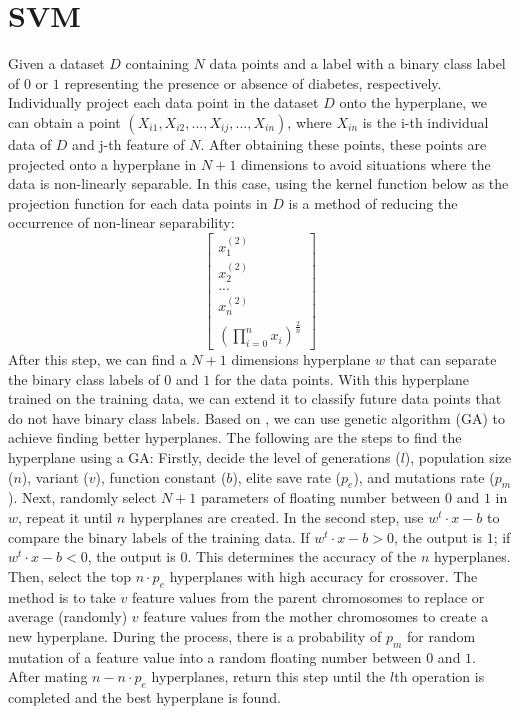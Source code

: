 \documentclass[twocolumn,10pt]{article}
\begin{document}
\section{SVM}
  Given a dataset $D$ containing $N$ data points and a label with a binary class label of $0$ or $1$ representing the presence 
  or absence of diabetes, respectively. Individually project each data point in the dataset $D$ onto the hyperplane, we can obtain 
  a point $(X_{i1}, X_{i2}, ..., X_{ij}, ..., X_{in})$, where $X_{in}$ is the i-th individual data of $D$ and  j-th feature of $N$. 
  After obtaining these points, these points are projected onto a hyperplane in $N+1$ dimensions to avoid situations where the 
  data is non-linearly separable. 
  In this case, using the kernel function below as the projection function for each data points in $D$ is a method of reducing 
  the occurrence of non-linear separability: 
	$$\begin{bmatrix}x_1^{(2)} \\x_2^{(2)} \\... \\x_n^{(2)} \\ (\prod_{i=0}^{n} x_i)^{\frac{2}{n}} \end{bmatrix}$$
  After this step, we can find a $N+1$ dimensions hyperplane $w$ that can separate the binary class labels of $0$ and $1$ for 
  the data points. With this hyperplane trained on the training data, we can extend it to classify future data points that do 
  not have binary class labels. 
  Based on \cite{santhanam2015application}, we can use genetic algorithm (GA) to achieve finding better hyperplanes. The following are the 
  steps to find the hyperplane using a GA: Firstly, decide the level of generations ($l$), population size ($n$), 
  variant ($v$), function constant ($b$), elite save rate ($p_e$), and mutations rate ($p_m$). Next, randomly select $N+1$ parameters 
  of floating number between $0$ and $1$ in $w$, repeat it until $n$ hyperplanes are created. 
  In the second step, use $w^t \cdot x - b$ \cite{kumari2013classification} to compare the binary labels of the training data. If 
  $w^t \cdot x - b > 0$, the output is $1$; if $w^t \cdot x - b < 0$, the output is $0$. This determines the accuracy of the $n$ hyperplanes. 
  Then, select the top $n \cdot p_e$ hyperplanes with high accuracy for crossover. The method is to take $v$ feature values from 
  the parent chromosomes to replace or average (randomly) $v$ feature values from the mother chromosomes to create a new hyperplane. 
  During the process, there is a probability of $p_m$ for random mutation of a feature value into a random floating number between 
  $0$ and $1$. After mating $n-n \cdot p_e$ hyperplanes, return this step until the $l$th operation is completed and the best hyperplane 
  is found.
   
\end{document}
